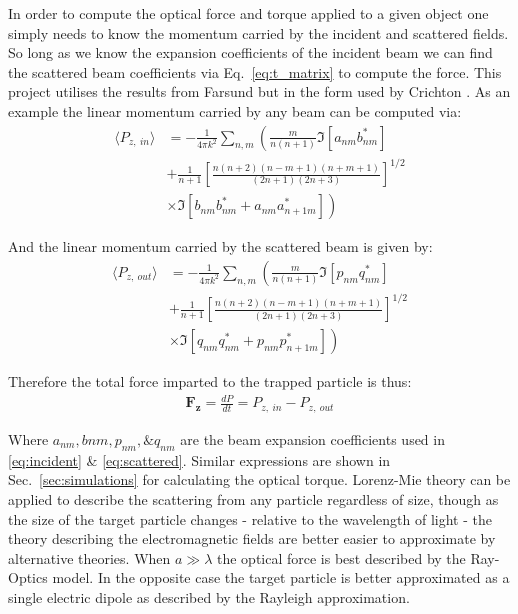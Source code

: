 In order to compute the optical force and torque applied to a 
given object one simply needs to know the momentum carried by 
the incident and scattered fields. So long as we know the 
expansion coefficients of the incident beam we can find the 
scattered beam coefficients via Eq.~\eqref{eq:t_matrix} to 
compute the force. This project utilises the results from 
Farsund \cite{Farsund1996} but in the form used by Crichton 
\cite{Crichton2000THEMD}. As an example the linear momentum 
carried by any beam can be computed via:
\begin{equation}
	\label{eq:linear_momentum_in}
	\begin{split}
		\langle P_{z,\ in} \rangle
		&=
		-\frac{1}{4\pi k^2}\sum_{n,m} \left(\frac{m}{n(n+1)}\Im[a_{nm}b^*_{nm}] \right.
		\\ 
		&+\frac{1}{n+1}\left[\frac{n(n+2)(n-m+1)(n+m+1)}{(2n+1)(2n+3)} \right]^{1/2}
		\\
		& \left.\times\Im[b_{nm}b^*_{nm}+a_{nm}a^*_{n+1m}] \right)
	\end{split}
\end{equation}

And the linear momentum carried by the scattered beam is given by:
\begin{equation}
	\label{eq:linear_momentum_out}
	\begin{split}
		\langle P_{z,\ out} \rangle
		&=
		-\frac{1}{4\pi k^2}\sum_{n,m} \left(\frac{m}{n(n+1)}\Im[p_{nm}q^*_{nm}] \right.
		\\ 
		&+\frac{1}{n+1}\left[\frac{n(n+2)(n-m+1)(n+m+1)}{(2n+1)(2n+3)} \right]^{1/2}
		\\
		& \left.\times\Im[q_{nm}q^*_{nm}+p_{nm}p^*_{n+1m}] \right)
	\end{split}
\end{equation}

Therefore the total force imparted to the trapped particle is thus:
\begin{align}
	\boldsymbol{F_z} =\frac{dP}{dt} = P_{z,\ in} -P_{z,\ out}
	\label{eq:Fz}
\end{align}

\noindent
Where $a_{nm}, b{nm}, p_{nm}, \& q_{nm}$ are the beam expansion 
coefficients used in \eqref{eq:incident} \& \eqref{eq:scattered}.
Similar expressions are shown in Sec.~\ref{sec:simulations} for 
calculating the optical torque. Lorenz-Mie theory can be applied 
to describe the scattering from any particle regardless of size, 
though as the size of the target particle changes - relative to 
the wavelength of light - the theory describing the electromagnetic 
fields are better easier to approximate by alternative theories. 
When $a \gg \lambda$ the optical force is best described by the 
Ray-Optics model. In the opposite case the target particle is 
better approximated as a single electric dipole as described by 
the Rayleigh approximation.  

